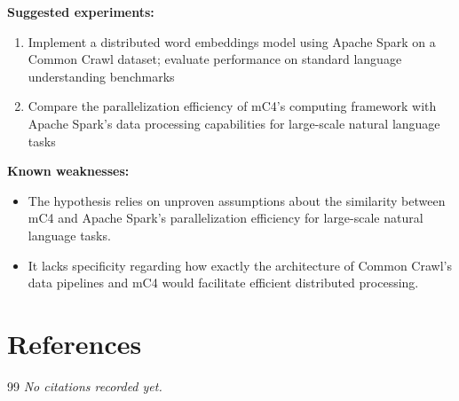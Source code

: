 \documentclass[12pt,a4paper]{article}
\begin{document}
\textbf{Suggested experiments:}
\begin{enumerate}
  \item Implement a distributed word embeddings model using Apache Spark on a Common Crawl dataset; evaluate performance on standard language understanding benchmarks
  \item Compare the parallelization efficiency of mC4's computing framework with Apache Spark's data processing capabilities for large-scale natural language tasks
\end{enumerate}

\textbf{Known weaknesses:}
\begin{itemize}
  \item The hypothesis relies on unproven assumptions about the similarity between mC4 and Apache Spark's parallelization efficiency for large-scale natural language tasks.
  \item It lacks specificity regarding how exactly the architecture of Common Crawl's data pipelines and mC4 would facilitate efficient distributed processing.
\end{itemize}


\section{References}

\begin{thebibliography}{99}
\textit{No citations recorded yet.}
\end{thebibliography}
\end{document}
